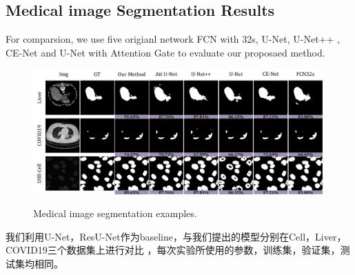 \documentclass[UTF8]{article} %
\begin{document}
\subsection{Medical image Segmentation Results}
For comparsion, we use five origianl network FCN with 32s\cite{fcn}, U-Net\cite{unet}, U-Net++\cite{unet++} , CE-Net\cite{cenet} and U-Net with Attention Gate\cite{attentiongate}
to evaluate our proposaed method. 
\begin{figure}[htbp]
  \begin{center}
  \includegraphics[width=0.99\textwidth]{figure/result.pdf}
  \vspace{-2mm}
  \caption{Medical image segmentation examples.} 
  \vspace{-2mm}
  \label{fig:result}
  \end{center}
  \vspace{-0.35cm}
\end{figure}

我们利用U-Net，ResU-Net作为baseline，与我们提出的模型分别在Cell，Liver，COVID19三个数据集上进行对比
，每次实验所使用的参数，训练集，验证集，测试集均相同。
\end{document}

